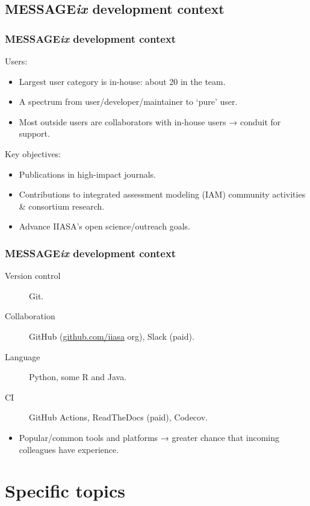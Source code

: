 \documentclass[12pt,aspectratio=169]{beamer}
\begin{document}
\subsection{MESSAGE\emph{ix} development context}

\begin{frame}
\frametitle{MESSAGE\emph{ix} development context}

Users:
\begin{itemize}
  \item Largest user category is in-house: about 20 in the team.
  \item A spectrum from user/developer/maintainer to ‘pure’ user.
  \item Most outside users are collaborators with in-house users → conduit for support.
\end{itemize}

\bigskip
Key objectives:
  \begin{itemize}
    \item Publications in high-impact journals.
    \item Contributions to integrated assessment modeling (IAM) community activities \& consortium research.
    \item Advance IIASA's open science/outreach goals.
  \end{itemize}

\end{frame}

\begin{frame}
\frametitle{MESSAGE\emph{ix} development context}

\begin{description}
  \item [Version control] Git.
  \item [Collaboration] GitHub (\href{https://github.com/iiasa}{github.com/iiasa} org), Slack (paid).
  \item [Language] Python, some R and Java.
  \item [CI] GitHub Actions, ReadTheDocs (paid), Codecov.
\end{description}

\bigskip
\begin{itemize}
  \item Popular/common tools and platforms → greater chance that incoming colleagues have experience.
\end{itemize}

\end{frame}

\section{Specific topics}
\end{document}
